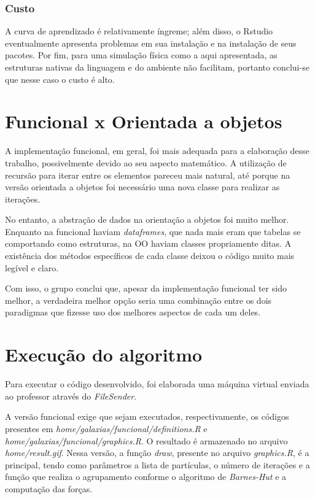 \documentclass[rel_mlp]{iiufrgs}
\begin{document}
\subsubsection{Custo}
A curva de aprendizado é relativamente íngreme; além disso, o Rstudio eventualmente apresenta problemas em sua instalação e na instalação de seus pacotes. Por fim, para uma simulação física como a aqui apresentada, as estruturas nativas da linguagem e do ambiente não facilitam, portanto conclui-se que nesse caso o custo é alto.

\section{Funcional x Orientada a objetos}

A implementação funcional, em geral, foi mais adequada para a elaboração desse trabalho, possivelmente
devido ao seu aspecto matemático. A utilização de recursão para iterar entre os elementos pareceu mais
natural, até porque na versão orientada a objetos foi necessário uma nova classe para realizar as iterações.

No entanto, a abstração de dados na orientação a objetos foi muito melhor. Enquanto na funcional haviam \textit{dataframes},
que nada mais eram que tabelas se comportando como estruturas, na OO haviam classes propriamente ditas. A existência dos
métodos específicos de cada classe deixou o código muito mais legível e claro.

Com isso, o grupo conclui que, apesar da implementação funcional ter sido melhor, a verdadeira melhor opção seria
uma combinação entre os dois paradigmas que fizesse uso dos melhores aspectos de cada um deles.

\section{Execução do algoritmo}

Para executar o código desenvolvido, foi elaborada uma máquina virtual enviada ao professor
através do \textit{FileSender}.

A versão funcional exige que sejam executados, respectivamente, os códigos presentes em
\textit{home/galaxias/funcional/definitions.R} e \textit{home/galaxias/funcional/graphics.R}.
O resultado é armazenado no arquivo \textit{home/result.gif}. Nessa versão, a função \textit{draw}, presente
no arquivo \textit{graphics.R}, é a principal, tendo como parâmetros a lista de partículas,
o número de iterações e a função que realiza o agrupamento conforme o algoritmo de \textit{Barnes-Hut}
e a computação das forças.
\end{document}
